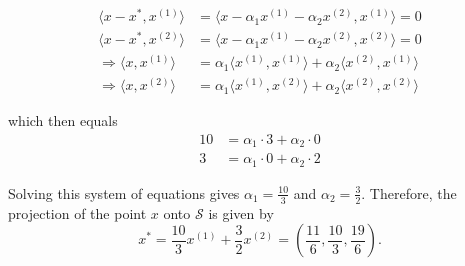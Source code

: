 \begin{homeworkProblem}
\begin{solution}
    \[
        \begin{split}
            \langle x - x^*, x^{(1)} \rangle &= \langle x - \alpha_1 x^{(1)} - \alpha_2 x^{(2)}, x^{(1)} \rangle = 0 \\
            \langle x - x^*, x^{(2)} \rangle &= \langle x - \alpha_1 x^{(1)} - \alpha_2 x^{(2)}, x^{(2)} \rangle = 0 \\
            \Rightarrow \langle x, x^{(1)} \rangle &= \alpha_1 \langle x^{(1)}, x^{(1)} \rangle + \alpha_2 \langle x^{(2)}, x^{(1)} \rangle \\
            \Rightarrow \langle x, x^{(2)} \rangle &= \alpha_1 \langle x^{(1)}, x^{(2)} \rangle + \alpha_2 \langle x^{(2)}, x^{(2)} \rangle
        \end{split}
    \]

    which then equals
    \[
        \begin{split}
            10 &= \alpha_1 \cdot 3 + \alpha_2 \cdot 0 \\
            3 &= \alpha_1 \cdot 0 + \alpha_2 \cdot 2
        \end{split}
    \]

    Solving this system of equations gives $\alpha_1 = \frac{10}{3}$ and $\alpha_2 = \frac{3}{2}$. 
    Therefore, the projection of the point $x$ onto $\mathcal S$ is given by 
    $$x^* = \frac{10}{3} x^{(1)} + \frac{3}{2} x^{(2)} = \left(\frac{11}{6}, \frac{10}{3}, \frac{19}{6}\right).$$
    

\end{solution}

\end{homeworkProblem}


